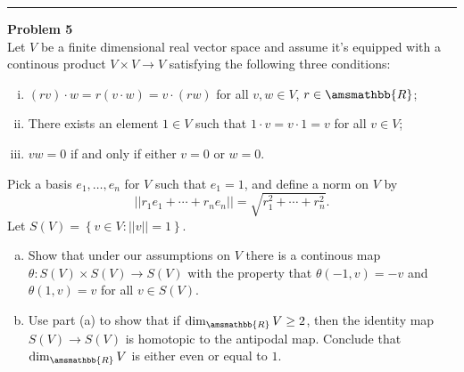 \documentclass[a4paper, 12pt]{article}
\newenvironment{problem}[2][Problem]
    { \begin{mdframed}[backgroundcolor=gray!20] \textbf{#1 #2} \\}
    {  \end{mdframed}}
\renewcommand{\mathbb}{\amsmathbb}
\begin{document}
\noindent\rule{7in}{2.8pt}
\begin{problem}{5}
Let \(V\) be a finite dimensional real vector space and assume it's equipped with a continous product \(V\times V\rightarrow V\) satisfying the following three conditions:
\begin{enumerate}[(i)]
\item \((rv)\cdot w=r(v\cdot w)=v\cdot (rw)\) for all \(v,w\in V\), \(r\in \mathbb{R}\); 
\item There exists an element \(1\in V\) such that \(1\cdot v=v\cdot 1=v\) for all \(v\in V\); 
\item \(vw=0\) if and only if either \(v=0\) or \(w=0\).
\end{enumerate}
Pick a basis \(e_1,\ldots,e_n\) for \(V\) such that \(e_1=1\), and define a norm on \(V\) by \
\[||r_1e_1+\cdots+r_ne_n||=\sqrt{r_1^2+\cdots+r_n^2}.\]
Let \(S(V)=\left\{ v\in V:||v||=1 \right\}\).
\begin{enumerate}[(a)]
\item Show that under our assumptions on \(V\) there is a continous map \(\theta:S(V)\times S(V)\rightarrow S(V)\) with the property that \(\theta(-1,v)=-v\) and \(\theta(1,v)=v\) for all \(v\in S(V)\). 
\item Use part (a) to show that if \(\dim_{\mathbb{R}}V\geq 2\), then the identity map \(S(V)\rightarrow S(V)\) is homotopic to the antipodal map. Conclude that \(\dim_{\mathbb{R}}V\) is either even or equal to \(1\).
\end{enumerate}
\end{problem}
\end{document}
